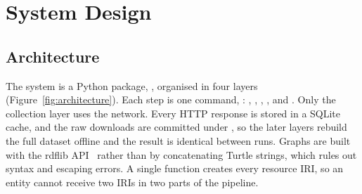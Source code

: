 \section{System Design}
\label{sec:design}

\subsection{Architecture}
\label{sec:architecture}

The system is a Python package, , organised in four layers
(Figure~\ref{fig:architecture}). Each step is one command,
: , ,
, ,  and . Only the
collection layer uses the network. Every HTTP response is stored in a SQLite
cache, and the raw downloads are committed under , so the later
layers rebuild the full dataset offline and the result is identical between
runs. Graphs are built with the rdflib API~\cite{rdflib} rather than by
concatenating Turtle strings, which rules out syntax and escaping errors. A
single function creates every resource IRI, so an entity cannot receive two
IRIs in two parts of the pipeline.

